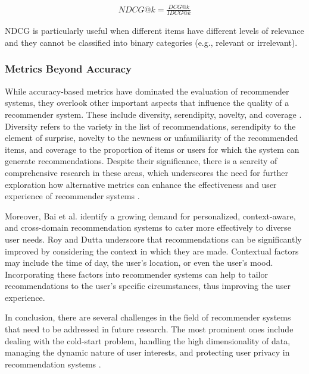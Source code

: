 \begin{align}
    NDCG@k = \frac{DCG@k}{IDCG@k} \label{eq:normalized-discounted-cumulative-gain}
\end{align}

\ac{NDCG} is particularly useful when different items have different levels of relevance and they cannot be classified into binary categories (e.g., relevant or irrelevant).


\subsubsection*{Metrics Beyond Accuracy}

While accuracy-based metrics have dominated the evaluation of recommender systems, they overlook other important aspects that influence the quality of a recommender system. These include diversity, serendipity, novelty, and coverage \cite{KaminskasDiversitySerendipity2016,SilveiraHowGood2019,BaiScientificPaper2020}.
Diversity refers to the variety in the list of recommendations, serendipity to the element of surprise, novelty to the newness or unfamiliarity of the recommended items, and coverage to the proportion of items or users for which the system can generate recommendations.
Despite their significance, there is a scarcity of comprehensive research in these areas, which underscores the need for further exploration how alternative metrics can enhance the effectiveness and user experience of recommender systems \cite{SilveiraHowGood2019}.

Moreover, Bai et al. \cite{BaiScientificPaper2020} identify a growing demand for personalized, context-aware, and cross-domain recommendation systems to cater more effectively to diverse user needs.
Roy and Dutta \cite{RoySystematicReview2022} underscore that recommendations can be significantly improved by considering the context in which they are made. Contextual factors may include the time of day, the user's location, or even the user's mood. Incorporating these factors into recommender systems can help to tailor recommendations to the user's specific circumstances, thus improving the user experience.

In conclusion, there are several challenges in the field of recommender systems that need to be addressed in future research. The most prominent ones include dealing with the cold-start problem, handling the high dimensionality of data, managing the dynamic nature of user interests, and protecting user privacy in recommendation systems \cite{BaiScientificPaper2020,RicciRecommenderSystems2015,KanakiaScalableHybrid2019,RoySystematicReview2022}.
